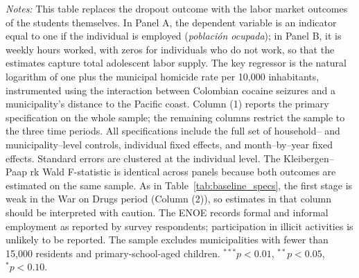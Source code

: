 \documentclass[12pt,letter,english,intoc,bibliography=totoc,index=totoc,BCOR10mm,captions=tableheading,nottitlepage,fleqn]{article}
\theoremstyle{break}
\begin{document}
\begin{table}[H]
\centering
\caption{Adolescent Employment Estimates}
\label{tab:employment_iv}
\centering
\scriptsize

\begin{minipage}{0.95\linewidth}
    \scriptsize \singlespacing
    \textit{Notes:} This table replaces the dropout outcome with the labor market outcomes of the students themselves. In Panel A, the dependent variable is an indicator equal to one if the individual is employed (\textit{poblaci\'{o}n ocupada}); in Panel B, it is weekly hours worked, with zeros for individuals who do not work, so that the estimates capture total adolescent labor supply. The key regressor is the natural logarithm of one plus the municipal homicide rate per 10{,}000 inhabitants, instrumented using the interaction between Colombian cocaine seizures and a municipality's distance to the Pacific coast. Column (1) reports the primary specification on the whole sample; the remaining columns restrict the sample to the three time periods. All specifications include the full set of household-- and municipality--level controls, individual fixed effects, and month--by--year fixed effects. Standard errors are clustered at the individual level. The Kleibergen--Paap rk Wald F-statistic is identical across panels because both outcomes are estimated on the same sample. As in Table~\ref{tab:baseline_specs}, the first stage is weak in the War on Drugs period (Column (2)), so estimates in that column should be interpreted with caution. The ENOE records formal and informal employment as reported by survey respondents; participation in illicit activities is unlikely to be reported. The sample excludes municipalities with fewer than 15{,}000 residents and primary-school-aged children. $^{***}p<0.01$, $^{**}p<0.05$, $^{*}p<0.10$.
    \end{minipage}
\end{table}
\end{document}
